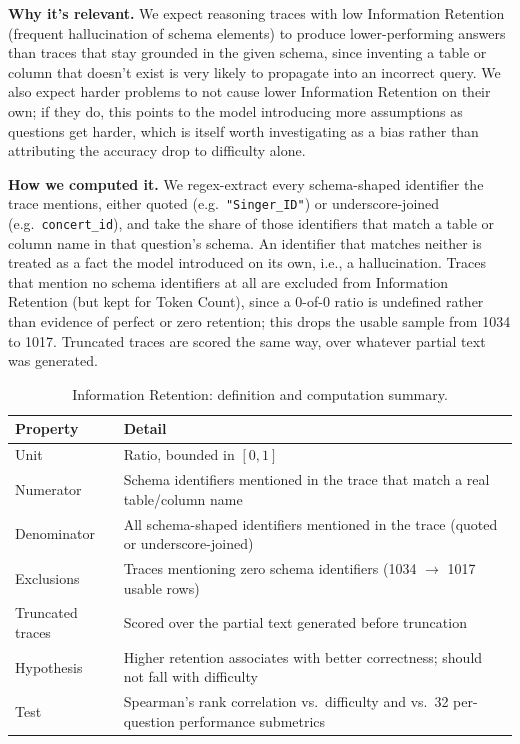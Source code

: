 \textbf{Why it's relevant.} We expect reasoning traces with low Information Retention (frequent hallucination of schema elements) to produce lower-performing answers than traces that stay grounded in the given schema, since inventing a table or column that doesn't exist is very likely to propagate into an incorrect query. We also expect harder problems to not cause lower Information Retention on their own; if they do, this points to the model introducing more assumptions as questions get harder, which is itself worth investigating as a bias rather than attributing the accuracy drop to difficulty alone.

\textbf{How we computed it.} We regex-extract every schema-shaped identifier the trace mentions, either quoted (e.g.\ \texttt{"Singer\_ID"}) or underscore-joined (e.g.\ \texttt{concert\_id}), and take the share of those identifiers that match a table or column name in that question's schema. An identifier that matches neither is treated as a fact the model introduced on its own, i.e., a hallucination. Traces that mention no schema identifiers at all are excluded from Information Retention (but kept for Token Count), since a 0-of-0 ratio is undefined rather than evidence of perfect or zero retention; this drops the usable sample from 1034 to 1017. Truncated traces are scored the same way, over whatever partial text was generated.

\begin{table}[H]
\centering
\footnotesize
\caption{Information Retention: definition and computation summary.}
\label{tab:rq2-feature-retention-summary}
\begin{tabular}{p{}p{}}
\toprule
Property & Detail \\
\midrule
Unit & Ratio, bounded in $[0,1]$ \\
Numerator & Schema identifiers mentioned in the trace that match a real table/column name \\
Denominator & All schema-shaped identifiers mentioned in the trace (quoted or underscore-joined) \\
Exclusions & Traces mentioning zero schema identifiers (1034 $\rightarrow$ 1017 usable rows) \\
Truncated traces & Scored over the partial text generated before truncation \\
Hypothesis & Higher retention associates with better correctness; should not fall with difficulty \\
Test & Spearman's rank correlation vs.\ difficulty and vs.\ 32 per-question performance submetrics \\
\bottomrule
\end{tabular}
\end{table}

